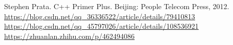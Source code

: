 \documentclass[12pt]{article}
\begin{document}
\begin{thebibliography}{1}
     Stephen Prata. C++ Primer Plus. Beijing: People Telecom Press, 2012.
     \url{https://blog.csdn.net/qq_36336522/article/details/79410813}
     \url{https://blog.csdn.net/qq_45797026/article/details/108536921}
     \url{https://zhuanlan.zhihu.com/p/462494086}
\end{thebibliography}
    
\end{document}

